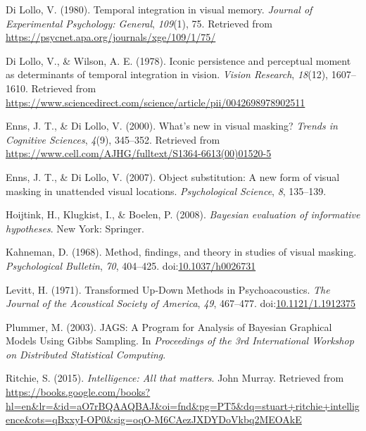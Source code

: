 \documentclass[
  ,man]{apa6}
\newlength{\cslhangindent}
\newlength{\cslentryspacingunit} %
\newenvironment{CSLReferences}[2] %
 {%
  \setlength{\parindent}{0pt}
  \ifodd #1
  \let\oldpar\par
  \def\par{\hangindent=\cslhangindent\oldpar}
  \fi
  \setlength{\parskip}{#2\cslentryspacingunit}
 }%
 {}
\begin{document}
\begin{CSLReferences}{1}{0}
\leavevmode{}%
Di Lollo, V. (1980). Temporal integration in visual memory. \emph{Journal of Experimental Psychology: General}, \emph{109}(1), 75. Retrieved from \url{https://psycnet.apa.org/journals/xge/109/1/75/}

\leavevmode{}%
Di Lollo, V., \& Wilson, A. E. (1978). Iconic persistence and perceptual moment as determinants of temporal integration in vision. \emph{Vision Research}, \emph{18}(12), 1607--1610. Retrieved from \url{https://www.sciencedirect.com/science/article/pii/0042698978902511}

\leavevmode{}%
Enns, J. T., \& Di Lollo, V. (2000). What's new in visual masking? \emph{Trends in Cognitive Sciences}, \emph{4}(9), 345--352. Retrieved from \url{https://www.cell.com/AJHG/fulltext/S1364-6613(00)01520-5}

\leavevmode{}%
Enns, J. T., \& Di Lollo, V. (2007). Object substitution: {A} new form of visual masking in unattended visual locations. \emph{Psychological Science}, \emph{8}, 135--139.

\leavevmode{}%
Hoijtink, H., Klugkist, I., \& Boelen, P. (2008). \emph{Bayesian evaluation of informative hypotheses}. New York: Springer.

\leavevmode{}%
Kahneman, D. (1968). Method, findings, and theory in studies of visual masking. \emph{Psychological Bulletin}, \emph{70}, 404--425. doi:\href{https://doi.org/10.1037/h0026731}{10.1037/h0026731}

\leavevmode{}%
Levitt, H. (1971). Transformed {Up}‐{Down Methods} in {Psychoacoustics}. \emph{The Journal of the Acoustical Society of America}, \emph{49}, 467--477. doi:\href{https://doi.org/10.1121/1.1912375}{10.1121/1.1912375}

\leavevmode{}%
Plummer, M. (2003). {JAGS}: {A Program} for {Analysis} of {Bayesian Graphical Models Using Gibbs Sampling}. In \emph{Proceedings of the 3rd {International Workshop} on {Distributed Statistical Computing}}.

\leavevmode{}%
Ritchie, S. (2015). \emph{Intelligence: {All} that matters}. John Murray. Retrieved from \url{https://books.google.com/books?hl=en\&lr=\&id=aO7rBQAAQBAJ\&oi=fnd\&pg=PT5\&dq=stuart+ritchie+intelligence\&ots=qBxxyI-OP0\&sig=oqO-M6CAezJXDYDoVkbq2MEOAkE}


\end{CSLReferences}
\end{document}
